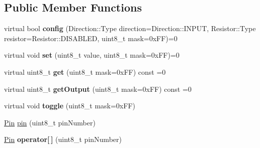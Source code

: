 \subsection*{Public Member Functions}
\begin{DoxyCompactItemize}
\item 
\hypertarget{classyahal_1_1mcu_1_1_gpio_1_1_port_a20da8a9eded1eac1ad3163fa218e51ff}{}virtual bool {\bfseries config} (Direction\+::\+Type direction=Direction\+::\+I\+N\+P\+U\+T, Resistor\+::\+Type resistor=Resistor\+::\+D\+I\+S\+A\+B\+L\+E\+D, uint8\+\_\+t mask=0x\+F\+F)=0\label{classyahal_1_1mcu_1_1_gpio_1_1_port_a20da8a9eded1eac1ad3163fa218e51ff}

\item 
\hypertarget{classyahal_1_1mcu_1_1_gpio_1_1_port_aed59cdf9217ca14979c8473684de2fb4}{}virtual void {\bfseries set} (uint8\+\_\+t value, uint8\+\_\+t mask=0x\+F\+F)=0\label{classyahal_1_1mcu_1_1_gpio_1_1_port_aed59cdf9217ca14979c8473684de2fb4}

\item 
\hypertarget{classyahal_1_1mcu_1_1_gpio_1_1_port_a22013884f0e35c548e6dcce6842c5060}{}virtual uint8\+\_\+t {\bfseries get} (uint8\+\_\+t mask=0x\+F\+F) const =0\label{classyahal_1_1mcu_1_1_gpio_1_1_port_a22013884f0e35c548e6dcce6842c5060}

\item 
\hypertarget{classyahal_1_1mcu_1_1_gpio_1_1_port_ad9b061969be01dc7d5087bbdfc938961}{}virtual uint8\+\_\+t {\bfseries get\+Output} (uint8\+\_\+t mask=0x\+F\+F) const =0\label{classyahal_1_1mcu_1_1_gpio_1_1_port_ad9b061969be01dc7d5087bbdfc938961}

\item 
\hypertarget{classyahal_1_1mcu_1_1_gpio_1_1_port_a04667de64bf79fbc59a1a7fb7051d88f}{}virtual void {\bfseries toggle} (uint8\+\_\+t mask=0x\+F\+F)\label{classyahal_1_1mcu_1_1_gpio_1_1_port_a04667de64bf79fbc59a1a7fb7051d88f}

\item 
\hyperlink{classyahal_1_1mcu_1_1_gpio_1_1_port_1_1_pin}{Pin} \hyperlink{classyahal_1_1mcu_1_1_gpio_1_1_port_aa16ce5a6eac5b549121b6036286945fe}{pin} (uint8\+\_\+t pin\+Number)
\item 
\hypertarget{classyahal_1_1mcu_1_1_gpio_1_1_port_aa3e1b5349a9c91e83ccea36e198e9fa8}{}\hyperlink{classyahal_1_1mcu_1_1_gpio_1_1_port_1_1_pin}{Pin} {\bfseries operator\mbox{[}$\,$\mbox{]}} (uint8\+\_\+t pin\+Number)\label{classyahal_1_1mcu_1_1_gpio_1_1_port_aa3e1b5349a9c91e83ccea36e198e9fa8}

\end{DoxyCompactItemize}


